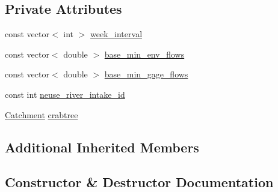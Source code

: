 \subsection*{Private Attributes}
\begin{DoxyCompactItemize}
\item 
const vector$<$ int $>$ \mbox{\hyperlink{classFallsLakeMinEnvFlowControl_a382dbd49bfc62c5e6ba2a56cfb7682e3_a382dbd49bfc62c5e6ba2a56cfb7682e3}{week\+\_\+interval}}
\item 
const vector$<$ double $>$ \mbox{\hyperlink{classFallsLakeMinEnvFlowControl_a7780ba93a2ea312c6f48ff741f6f8291_a7780ba93a2ea312c6f48ff741f6f8291}{base\+\_\+min\+\_\+env\+\_\+flows}}
\item 
const vector$<$ double $>$ \mbox{\hyperlink{classFallsLakeMinEnvFlowControl_a0250acb652ec1fd55423cc3702f3f6a0_a0250acb652ec1fd55423cc3702f3f6a0}{base\+\_\+min\+\_\+gage\+\_\+flows}}
\item 
const int \mbox{\hyperlink{classFallsLakeMinEnvFlowControl_aa0e54d145d945d9b8c462294187e7fb5_aa0e54d145d945d9b8c462294187e7fb5}{neuse\+\_\+river\+\_\+intake\+\_\+id}}
\item 
\mbox{\hyperlink{classCatchment}{Catchment}} \mbox{\hyperlink{classFallsLakeMinEnvFlowControl_af12d738a62d604cd01ee48bfc6c73c6d_af12d738a62d604cd01ee48bfc6c73c6d}{crabtree}}
\end{DoxyCompactItemize}
\subsection*{Additional Inherited Members}


\subsection{Constructor \& Destructor Documentation}
\mbox{\label{classFallsLakeMinEnvFlowControl_a9cef248e2fd8a194c92454a79398a6a6_a9cef248e2fd8a194c92454a79398a6a6}} 
